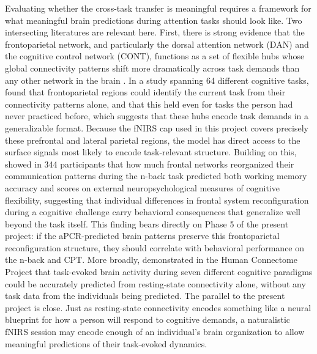 Evaluating whether the cross-task transfer is meaningful requires a framework for what meaningful brain predictions during attention tasks should look like. Two intersecting literatures are relevant here. First, there is strong evidence that the frontoparietal network, and particularly the dorsal attention network (DAN) and the cognitive control network (CONT), functions as a set of flexible hubs whose global connectivity patterns shift more dramatically across task demands than any other network in the brain \citep{cole2013}. In a study spanning 64 different cognitive tasks, \citet{cole2013} found that frontoparietal regions could identify the current task from their connectivity patterns alone, and that this held even for tasks the person had never practiced before, which suggests that these hubs encode task demands in a generalizable format. Because the fNIRS cap used in this project covers precisely these prefrontal and lateral parietal regions, the model has direct access to the surface signals most likely to encode task-relevant structure. Building on this, \citet{braun2015} showed in 344 participants that how much frontal networks reorganized their communication patterns during the n-back task predicted both working memory accuracy and scores on external neuropsychological measures of cognitive flexibility, suggesting that individual differences in frontal system reconfiguration during a cognitive challenge carry behavioral consequences that generalize well beyond the task itself. This finding bears directly on Phase 5 of the present project: if the aPCR-predicted brain patterns preserve this frontoparietal reconfiguration structure, they should correlate with behavioral performance on the n-back and CPT. More broadly, \citet{tavor2016} demonstrated in the Human Connectome Project that task-evoked brain activity during seven different cognitive paradigms could be accurately predicted from resting-state connectivity alone, without any task data from the individuals being predicted. The parallel to the present project is close. Just as resting-state connectivity encodes something like a neural blueprint for how a person will respond to cognitive demands, a naturalistic fNIRS session may encode enough of an individual's brain organization to allow meaningful predictions of their task-evoked dynamics.

